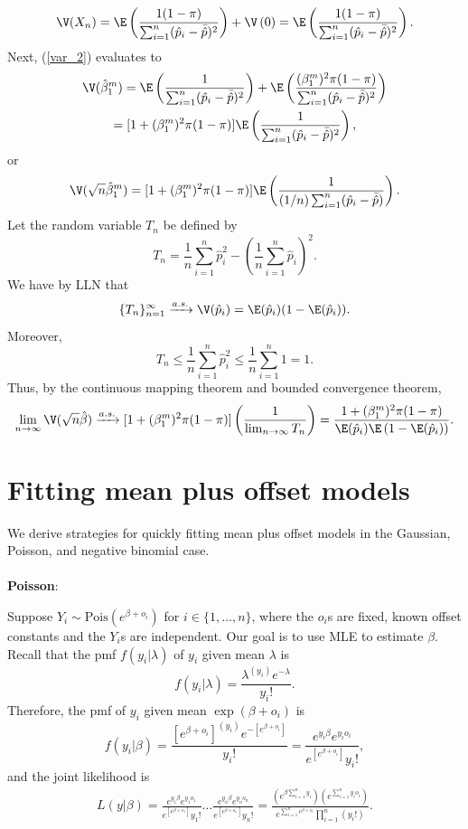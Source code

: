 \documentclass[12pt]{article}
\begin{document}
$$ \V(X_n) = \E \left( \frac{ 1(1-\pi) }{ \sum_{i=1}^n (\hat{p}_i - \bar{\hat{p}})^2} \right) + \V \left(0\right)  =  \E \left( \frac{ 1(1-\pi) }{ \sum_{i=1}^n (\hat{p}_i - \bar{\hat{p}})^2} \right).$$ Next, (\ref{var_2}) evaluates to
\begin{multline*}
 \V(\hat{\beta}^m_1) = \E \left( \frac{ 1 }{\sum_{i=1}^n (\hat{p}_i - \bar{\hat{p}})^2} \right) + \E \left( \frac{(\beta_1^m)^2 \pi(1-\pi)}{ \sum_{i=1}^n (\hat{p}_i - \bar{\hat{p}})^2} \right) \\ =[1+(\beta_1^m)^2 \pi(1-\pi)] \E \left( \frac{1}{ \sum_{i=1}^n (\hat{p}_i - \bar{\hat{p}})^2 } \right),
\end{multline*}
or
\begin{equation}\label{var_4}
\V( \sqrt{n} \hat{\beta}^m_1 ) = [1 + (\beta^m_1)^2 \pi(1-\pi)] \E \left(\frac{1}{ (1/n) \sum_{i=1}^n  ( \hat{p}_i - \bar{\hat{p}})}\right).
\end{equation}
Let the random variable $T_n$ be defined by
$$T_n = \frac{1}{n}\sum_{i=1}^n \hat{p}_i^2 - \left(\frac{1}{n} \sum_{i=1}^n \hat{p}_i \right)^2.$$ We have by LLN that
$$\{ T_n\}_{n=1}^\infty \xrightarrow{a.s.} \V(\hat{p}_i) = \E(\hat{p}_i)( 1 - \E(\hat{p}_i)).$$
Moreover, 
$$T_n\leq \frac{1}{n} \sum_{i=1}^n \hat{p}_i^2 \leq \frac{1}{n} \sum_{i=1}^n 1 = 1.$$
Thus, by the continuous mapping theorem and bounded convergence theorem,
$$\lim_{n \to \infty} \V(\sqrt{n} \hat{\beta}) \xrightarrow{a.s.} [1 + (\beta^m_1)^2 \pi(1-\pi)] \left( \frac{1}{\lim_{n\to\infty} T_n} \right) = \frac{ 1 + (\beta^m_1)^2 \pi(1-\pi) }{ \E(\hat{p}_i) \E\left(1 - \E(\hat{p}_i)\right)}.$$
\section{Fitting mean plus offset models}

We derive strategies for quickly fitting mean plus offset models in the Gaussian, Poisson, and negative binomial case.
\\ \\
\textbf{Poisson}:

Suppose $Y_i \sim \textrm{Pois}( e^{ \beta + o_i } )$ for $i \in \{1, \dots, n\}$, where the $o_i$s are fixed, known offset constants and the $Y_i$s are independent. Our goal is to use MLE to estimate $\beta$. Recall that the pmf $f(y_i | \lambda)$ of $y_i$ given mean $\lambda$ is
$$ f(y_i | \lambda) =  \frac{ \lambda^{(y_i)} e^{-\lambda} }{ y_i!}.$$ Therefore, the pmf of $y_i$ given mean $ \exp\left( \beta + o_i \right) $ is 
$$ f(y_i | \beta) = \frac{\left[ e^{\beta + o_i}  \right]^{(y_i)} e ^{ - \left[ e^{\beta + o_i}  \right] }}{ y_i! } = \frac{ e^{y_i\beta} e^{y_i o_i}   }{ e^{\left[ e^{\beta + o_i} \right]} y_i! },$$ and the joint likelihood is
\begin{multline*}
 L( y | \beta ) = \frac{ e^{ y_1 \beta } e^{ y_1 o_1}}{ e^{ \left[ e^{ \beta + o_1 } \right] } y_1! } \dots \frac{ e^{ y_n \beta } e^{ y_n o_n}}{ e^{ \left[ e^{ \beta + o_n } \right] } y_n! }  = \frac{ \left( e^{ \beta \sum_{i=1}^n y_i} \right) \left(e^{ \sum_{i=1}^n y_io_i} \right)}{ e^{ \sum_{i=1}^n e^{\beta + o_i}}  \prod_{i=1}^n \left( y_i! \right) }.
\end{multline*}
\end{document}
